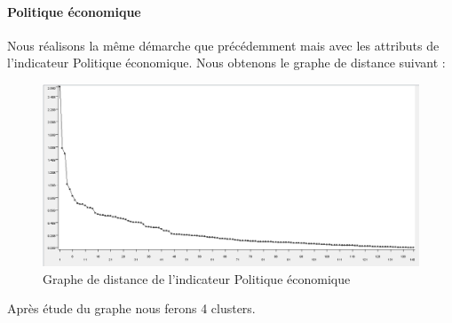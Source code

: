 \paragraph{Politique économique}
Nous réalisons la même démarche que précédemment mais avec les attributs de l'indicateur Politique économique. Nous obtenons le graphe de distance suivant : 
\begin{figure}[H]
	\begin{center}
		\includegraphics[scale=0.5]{Image/DistancePolitiqueNoMissing2}
		\caption{Graphe de distance de l'indicateur Politique économique\jeuc}
	\end{center}
\end{figure}

Après étude du graphe nous ferons 4 clusters.